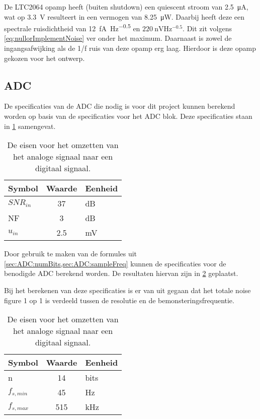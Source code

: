 De LTC2064 opamp heeft (buiten shutdown) een quiescent stroom van \qty{2.5}{\micro\ampere}, wat op \qty{3.3}{\volt} resulteert in een vermogen van \qty{8.25}{\micro\watt}. Daarbij heeft deze een spectrale ruisdichtheid van \qty{12}{\femto\ampere\hertz^{-0.5}} en $\qty{220}{\nano\volt\hertz^{-0.5}}$\cite{LTC2064}. Dit zit volgens \cref{eq:nullorImplementNoise} ver onder het maximum. Daarnaast is zowel de ingangsafwijking als de 1/f ruis van deze opamp erg laag. Hierdoor is deze opamp gekozen voor het ontwerp.

\subsection{ADC} \label{sec:selectingADCandReqs}
De specificaties van de ADC die nodig is voor dit project kunnen berekend worden op basis van de specificaties voor het ADC blok. Deze specificaties staan in \cref{tab:systemSpecADC} samengevat.
\begin{table}[!htbp]
    \centering
    \begin{tabular}{l|c|l}
        Symbol      & Waarde & Eenheid\\\hline
        $SNR_{in}$  & 37        & dB\\
        NF          & 3         & dB\\
        $u_{in}$    & 2.5       & mV\\
    \end{tabular}
    \caption{De eisen voor het omzetten van het analoge signaal naar een digitaal signaal.}
    \label{tab:systemSpecADC}
\end{table}

Door gebruik te maken van de formules uit \cref{sec:ADC:numBits,sec:ADC:sampleFreq} kunnen de specificaties voor de benodigde ADC berekend worden. De resultaten hiervan zijn in  \cref{tab:specADC} geplaatst.

Bij het berekenen van deze specificaties is er van uit gegaan dat het totale noise figure 1 op 1 is verdeeld tussen de resolutie en de bemonsteringsfrequentie.
\begin{table}[!htbp]
    \centering
    \begin{tabular}{l|c|l}
        Symbol      & Waarde    & Eenheid\\\hline
        n           & 14        & bits\\
        $f_{s,min}$ & 45        & Hz\\
        $f_{s,max}$ & 515       & kHz\\
    \end{tabular}
    \caption{De eisen voor het omzetten van het analoge signaal naar een digitaal signaal.}
    \label{tab:specADC}
\end{table}

